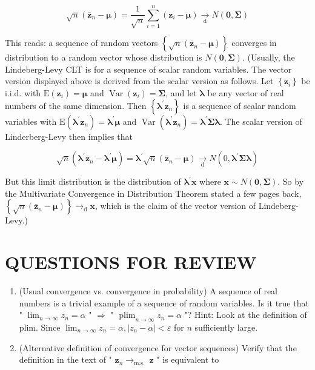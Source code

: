 \documentclass[10pt]{article}
\begin{document}
$$
\sqrt{n}\left(\overline{\mathbf{z}}_{n}-\boldsymbol{\mu}\right)=\frac{1}{\sqrt{n}} \sum_{i=1}^{n}\left(\mathbf{z}_{i}-\boldsymbol{\mu}\right) \underset{\mathrm{d}}{\rightarrow} N(\mathbf{0}, \mathbf{\Sigma})
$$

This reads: a sequence of random vectors $\left\{\sqrt{n}\left(\overline{\mathbf{z}}_{n}-\boldsymbol{\mu}\right)\right\}$ converges in distribution to a random vector whose distribution is $N(\mathbf{0}, \boldsymbol{\Sigma})$. (Usually, the Lindeberg-Levy CLT is for a sequence of scalar random variables. The vector version displayed above is derived from the scalar version as follows. Let $\left\{\mathbf{z}_{i}\right\}$ be i.i.d. with $\mathrm{E}\left(\mathbf{z}_{i}\right)=\boldsymbol{\mu}$ and $\operatorname{Var}\left(\mathbf{z}_{i}\right)=\boldsymbol{\Sigma}$, and let $\boldsymbol{\lambda}$ be any vector of real numbers of the same dimension. Then $\left\{\boldsymbol{\lambda}^{\prime} \mathbf{z}_{n}\right\}$ is a sequence of scalar random variables with $\mathrm{E}\left(\boldsymbol{\lambda}^{\prime} \mathbf{z}_{n}\right)=\boldsymbol{\lambda}^{\prime} \boldsymbol{\mu}$ and $\operatorname{Var}\left(\boldsymbol{\lambda}^{\prime} \mathbf{z}_{n}\right)=\boldsymbol{\lambda}^{\prime} \boldsymbol{\Sigma} \boldsymbol{\lambda}$. The scalar version of Linderberg-Levy then implies that

$$
\sqrt{n}\left(\boldsymbol{\lambda}^{\prime} \overline{\mathbf{z}}_{n}-\boldsymbol{\lambda}^{\prime} \boldsymbol{\mu}\right)=\boldsymbol{\lambda}^{\prime} \sqrt{n}\left(\overline{\mathbf{z}}_{n}-\boldsymbol{\mu}\right) \underset{\mathrm{d}}{\rightarrow} N\left(0, \boldsymbol{\lambda}^{\prime} \boldsymbol{\Sigma} \boldsymbol{\lambda}\right)
$$

But this limit distribution is the distribution of $\boldsymbol{\lambda}^{\prime} \mathbf{x}$ where $\mathbf{x} \sim N(\mathbf{0}, \boldsymbol{\Sigma})$. So by the Multivariate Convergence in Distribution Theorem stated a few pages back, $\left\{\sqrt{n}\left(\overline{\mathbf{z}}_{n}-\boldsymbol{\mu}\right)\right\} \rightarrow_{\mathrm{d}} \mathbf{x}$, which is the claim of the vector version of Lindeberg-Levy.)

\section*{QUESTIONS FOR REVIEW}
\begin{enumerate}
  \item (Usual convergence vs. convergence in probability) A sequence of real numbers is a trivial example of a sequence of random variables. Is it true that " $\lim _{n \rightarrow \infty} z_{n}=\alpha$ " $\Rightarrow$ " $\operatorname{plim}_{n \rightarrow \infty} z_{n}=\alpha$ "? Hint: Look at the definition of plim. Since $\lim _{n \rightarrow \infty} z_{n}=\alpha,\left|z_{n}-\alpha\right|<\varepsilon$ for $n$ sufficiently large.
  \item (Alternative definition of convergence for vector sequences) Verify that the definition in the text of " $\mathbf{z}_{n} \rightarrow_{\text {m.s. }} \mathbf{z}$ " is equivalent to
\end{enumerate}
\end{document}
